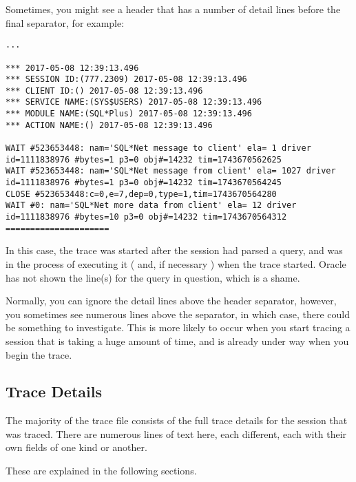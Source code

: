 \begin{note}
Sometimes, you might see a header that has a number of detail lines before the final separator, for example:

\begin{lstlisting}[numbers=none,caption={Oracle 11g Trace File Header - With Waits etc}]
...

*** 2017-05-08 12:39:13.496
*** SESSION ID:(777.2309) 2017-05-08 12:39:13.496
*** CLIENT ID:() 2017-05-08 12:39:13.496
*** SERVICE NAME:(SYS$USERS) 2017-05-08 12:39:13.496
*** MODULE NAME:(SQL*Plus) 2017-05-08 12:39:13.496
*** ACTION NAME:() 2017-05-08 12:39:13.496
 
WAIT #523653448: nam='SQL*Net message to client' ela= 1 driver id=1111838976 #bytes=1 p3=0 obj#=14232 tim=1743670562625
WAIT #523653448: nam='SQL*Net message from client' ela= 1027 driver id=1111838976 #bytes=1 p3=0 obj#=14232 tim=1743670564245
CLOSE #523653448:c=0,e=7,dep=0,type=1,tim=1743670564280
WAIT #0: nam='SQL*Net more data from client' ela= 12 driver id=1111838976 #bytes=10 p3=0 obj#=14232 tim=1743670564312
=====================
\end{lstlisting}

In this case, the trace was started after the session had parsed a query, and was in the process of executing it ( and, if necessary ) when the trace started. Oracle has not shown the  line(s) for the query in question, which is a shame.

Normally, you can ignore the detail lines above the header separator, however, you sometimes see numerous  lines above the separator, in which case, there could be something to investigate. This is more likely to occur when you start tracing a session that is taking a huge amount of time, and is already under way when you begin the trace.
\end{note}



\subsection{Trace Details}\label{trace-details}

The majority of the trace file consists of the full trace details for the session that was traced. There are numerous lines of text here, each different, each with their own fields of one kind or another.

These are explained in the following sections.

